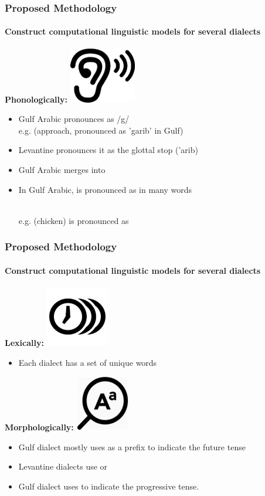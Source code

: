 \documentclass[xcolor=table]{beamer}
\begin{document}
\begin{frame}[<+->]
\frametitle{Proposed Methodology}
\framesubtitle{Construct computational linguistic models for several dialects}


\textbf{Phonologically:     }\includegraphics[scale=0.3]{img0022.png}
\begin{itemize}
    \item Gulf Arabic pronounces  as /g/ 
    \\ e.g.  (approach, pronounced as 'garib' in Gulf)
    \item Levantine pronounces it as the glottal stop ('arib)
    \item Gulf Arabic merges  into 
    \item In Gulf Arabic,  is pronounced as  in many words
    
    \\e.g.  (chicken) is pronounced as 
\end{itemize}

\end{frame}

\begin{frame}[<+->]
\frametitle{Proposed Methodology}
\framesubtitle{Construct computational linguistic models for several dialects}
\textbf{Lexically:   }\includegraphics[scale=0.3]{img0023.png}
\begin{itemize}
    \item Each dialect has a set of unique words
\end{itemize}

\textbf{Morphologically:   }\includegraphics[scale=0.3]{img0024.png}
\begin{itemize}
    \item Gulf dialect mostly uses 
 as a prefix to indicate the future tense
 \item Levantine
 dialects use  or 
 \item Gulf dialect uses  to indicate the progressive tense.
\end{itemize}

\end{frame}
\end{document}
